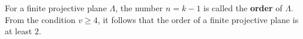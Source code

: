 For a finite projective plane $\Lambda$, the number $n = k - 1$ is called the \textbf{order} of $\Lambda$. From the condition $v \geq 4$, it follows that the order of a finite projective plane is at least $2$.
